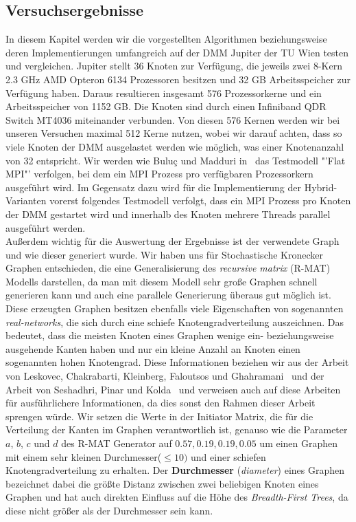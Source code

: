 \documentclass[11pt,a4paper]{article}
\begin{document}
\subsection{Versuchsergebnisse}
\label{sec:versuche}
In diesem Kapitel werden wir die vorgestellten Algorithmen beziehungsweise deren Implementierungen umfangreich auf der DMM Jupiter der TU Wien testen und vergleichen. Jupiter stellt 36 Knoten zur Verfügung, die jeweils zwei 8-Kern 2.3 GHz AMD Opteron 6134 Prozessoren besitzen und 32 GB Arbeitsspeicher zur Verfügung haben. Daraus resultieren insgesamt 576 Prozessorkerne und ein Arbeitsspeicher von 1152 GB. Die Knoten sind durch einen Infiniband QDR Switch MT4036 miteinander verbunden. Von diesen 576 Kernen werden wir bei unseren Versuchen maximal 512 Kerne nutzen, wobei wir darauf achten, dass so viele Knoten der DMM ausgelastet werden wie möglich, was einer Knotenanzahl von 32 entspricht. Wir werden wie Buluç und Madduri in~\cite{buluc} das Testmodell "'Flat MPI"' verfolgen, bei dem ein MPI Prozess pro verfügbaren Prozessorkern ausgeführt wird. Im Gegensatz dazu wird für die Implementierung der Hybrid-Varianten vorerst folgendes Testmodell verfolgt, dass ein MPI Prozess pro Knoten der DMM gestartet wird und innerhalb des Knoten mehrere Threads parallel ausgeführt werden.\\
Außerdem wichtig für die Auswertung der Ergebnisse ist der verwendete Graph und wie dieser generiert wurde. Wir haben uns für Stochastische Kronecker Graphen entschieden, die eine Generalisierung des \textit{recursive matrix} (R-MAT) Modells darstellen, da man mit diesem Modell sehr große Graphen schnell generieren kann und auch eine parallele Generierung überaus gut möglich ist. Diese erzeugten Graphen besitzen ebenfalls viele Eigenschaften von sogenannten \textit{real-networks}, die sich durch eine schiefe Knotengradverteilung auszeichnen. Das bedeutet, dass die meisten Knoten eines Graphen wenige ein- beziehungsweise ausgehende Kanten haben und nur ein kleine Anzahl an Knoten einen sogenannten hohen Knotengrad. Diese Informationen beziehen wir aus der Arbeit von Leskovec, Chakrabarti, Kleinberg, Faloutsos und Ghahramani~\cite{kronecker} und der Arbeit von Seshadhri, Pinar und Kolda~\cite{kronecker_study} und verweisen auch auf diese Arbeiten für ausführlichere Informationen, da dies sonst den Rahmen dieser Arbeit sprengen würde. Wir setzen die Werte in der Initiator Matrix, die für die Verteilung der Kanten im Graphen verantwortlich ist, genauso wie die Parameter \(a\), \(b\), \(c\) und \(d\) des R-MAT Generator auf \(0.57, 0.19, 0.19, 0.05\) um einen Graphen mit einem sehr kleinen Durchmesser(\(\leq 10)\)  und einer schiefen Knotengradverteilung zu erhalten. Der \textbf{Durchmesser} (\textit{diameter}) eines Graphen bezeichnet dabei die größte Distanz zwischen zwei beliebigen Knoten eines Graphen und hat auch direkten Einfluss auf die Höhe des \textit{Breadth-First Trees}, da diese nicht größer als der Durchmesser sein kann.\\
\end{document}
